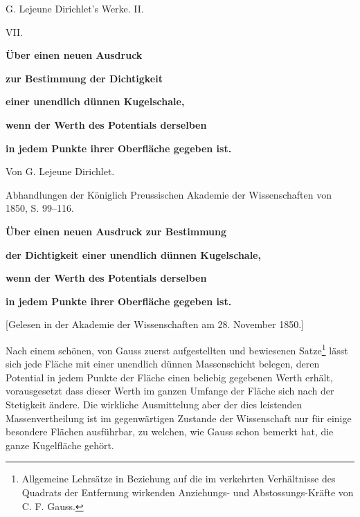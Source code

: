 \documentclass[11pt]{article}
\begin{document}
\begin{center}
{\Large G. Lejeune Dirichlet's Werke. II.}\par\vspace{1.2em}
{\Large VII.}\par\vspace{0.5em}
{\LARGE \textbf{Über einen neuen Ausdruck}}\par
{\LARGE \textbf{zur Bestimmung der Dichtigkeit}}\par
{\LARGE \textbf{einer unendlich dünnen Kugelschale,}}\par
{\LARGE \textbf{wenn der Werth des Potentials derselben}}\par
{\LARGE \textbf{in jedem Punkte ihrer Oberfläche gegeben ist.}}\par\vspace{1em}
{\large Von G. Lejeune Dirichlet.}\par\vspace{0.5em}
{\small Abhandlungen der Königlich Preussischen Akademie der Wissenschaften von 1850, S. 99--116.}
\end{center}

\begin{center}
{\large \textbf{Über einen neuen Ausdruck zur Bestimmung}}\par
{\large \textbf{der Dichtigkeit einer unendlich dünnen Kugelschale,}}\par
{\large \textbf{wenn der Werth des Potentials derselben}}\par
{\large \textbf{in jedem Punkte ihrer Oberfläche gegeben ist.}}\par
{\small [Gelesen in der Akademie der Wissenschaften am 28. November 1850.\footnotemark]}
\end{center}

Nach einem schönen, von Gauss zuerst aufgestellten und bewiesenen Satze\footnote{Allgemeine Lehrsätze in Beziehung auf die im verkehrten Verhältnisse des Quadrats der Entfernung wirkenden Anziehungs- und Abstossungs-Kräfte von C. F. Gauss.} lässt sich jede Fläche mit einer unendlich dünnen Massenschicht belegen, deren Potential in jedem Punkte der Fläche einen beliebig gegebenen Werth erhält, vorausgesetzt dass dieser Werth im ganzen Umfange der Fläche sich nach der Stetigkeit ändere. Die wirkliche Ausmittelung aber der dies leistenden Massenvertheilung ist im gegenwärtigen Zustande der Wissenschaft nur für einige besondere Flächen ausführbar, zu welchen, wie Gauss schon bemerkt hat, die ganze Kugelfläche gehört.
\end{document}
